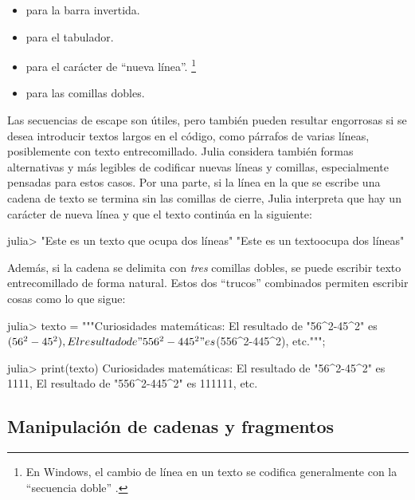 \begin{itemize}
  \item \code{\\} para la barra invertida. \\
  \item \code{\t} para el tabulador. \\
  \item \code{\n} para el carácter de ``nueva línea''.%
  \footnote{%
  En Windows, el cambio de línea en un texto se codifica generalmente con la ``secuencia doble'' \code{\r\n}.} \\
  \item \code{\"} para las comillas dobles. \\
\end{itemize}

Las secuencias de escape son útiles, pero también pueden resultar engorrosas si se desea introducir textos largos en el código, como párrafos de varias líneas, posiblemente con texto entrecomillado. Julia considera también formas alternativas y más legibles de codificar nuevas líneas y comillas, especialmente pensadas para estos casos. Por una parte, si la línea en la que se escribe una cadena de texto se termina sin las comillas de cierre, Julia interpreta que hay un carácter de nueva línea y que el texto continúa en la siguiente:

\begin{jlconcode}
julia> "Este es un texto
       que ocupa dos líneas"
"Este es un texto\nque ocupa dos líneas"
\end{jlconcode}

Además, si la cadena se delimita con \emph{tres} comillas dobles, se puede escribir texto entrecomillado de forma natural. Estos dos ``trucos'' combinados permiten escribir cosas como lo que sigue:

\begin{jlconcode}
julia> texto = """Curiosidades matemáticas:
       El resultado de "56^2-45^2" es $(56^2-45^2),
       El resultado de "556^2-445^2" es $(556^2-445^2),
       etc.""";

julia> print(texto)
Curiosidades matemáticas:
El resultado de "56^2-45^2" es 1111,
El resultado de "556^2-445^2" es 111111,
etc.
\end{jlconcode}

\subsection{Manipulación de cadenas y fragmentos}


